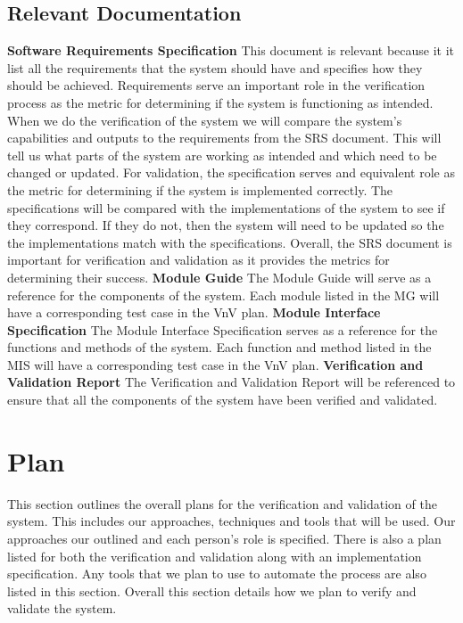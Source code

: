 \documentclass[12pt, titlepage]{article}
\begin{document}
\subsection{Relevant Documentation}

\noindent \textbf{Software Requirements Specification} \citet{SRS}
\newline
This document is relevant because it it list all the requirements that the system should have and specifies how they should be achieved.
Requirements serve an important role in the verification process as the metric for determining if the system is functioning as intended.
When we do the verification of the system we will compare the system's capabilities and outputs to the requirements from the SRS document.
This will tell us what parts of the system are working as intended and which need to be changed or updated.
For validation, the specification serves and equivalent role as the metric for determining if the system is implemented correctly.
The specifications will be compared with the implementations of the system to see if they correspond.
If they do not, then the system will need to be updated so the the implementations match with the specifications.
Overall, the SRS document is important for verification and validation as it provides the metrics for determining their success.
\bigskip
\newline
\textbf{Module Guide}
\newline
The Module Guide will serve as a reference for the components of the system.
Each module listed in the MG will have a corresponding test case in the VnV plan.
\bigskip
\newline
\textbf{Module Interface Specification}
\newline
The Module Interface Specification serves as a reference for the functions and methods of the system.
Each function and method listed in the MIS will have a corresponding test case in the VnV plan.
\bigskip
\newline
\textbf{Verification and Validation Report}
\newline
The Verification and Validation Report will be referenced to ensure that all the components of the system have been verified and validated.

\section{Plan}

This section outlines the overall plans for the verification and validation of the system.
This includes our approaches, techniques and tools that will be used.
Our approaches our outlined and each person's role is specified.
There is also a plan listed for both the verification and validation along with an implementation specification.
Any tools that we plan to use to automate the process are also listed in this section.
Overall this section details how we plan to verify and validate the system.
\end{document}

